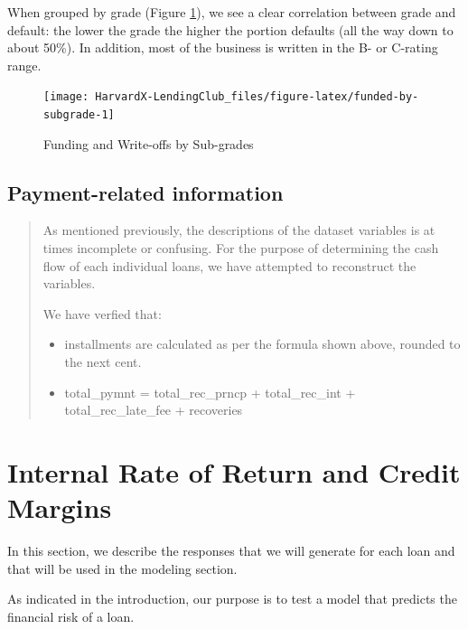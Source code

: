 \documentclass[11pt,]{report}
\begin{document}
When grouped by grade (Figure \ref{fig:funded-by-subgrade}), we see a clear correlation between grade and default: the lower the grade the higher the portion defaults (all the way down to about 50\%). In addition, most of the business is written in the B- or C-rating range.

\begin{figure}

{\centering \texttt{[image: HarvardX-LendingClub\_files/figure-latex/funded-by-subgrade-1]} 

}

\caption{Funding and Write-offs by Sub-grades}\label{fig:funded-by-subgrade}
\end{figure}

\hypertarget{payment-related-information}{%
\section{Payment-related information}\label{payment-related-information}}

\begin{quote}
As mentioned previously, the descriptions of the dataset variables is at times incomplete or confusing. For the purpose of determining the cash flow of each individual loans, we have attempted to reconstruct the variables.

We have verfied that:

\begin{itemize}
\item
  installments are calculated as per the formula shown above, rounded to the next cent.
\item
  total\_pymnt = total\_rec\_prncp + total\_rec\_int + total\_rec\_late\_fee + recoveries
\end{itemize}
\end{quote}

\hypertarget{internal-rate-of-return-and-credit-margins}{%
\chapter{Internal Rate of Return and Credit Margins}\label{internal-rate-of-return-and-credit-margins}}

In this section, we describe the responses that we will generate for each loan and that will be used in the modeling section.

As indicated in the introduction, our purpose is to test a model that predicts the financial risk of a loan.
\end{document}
